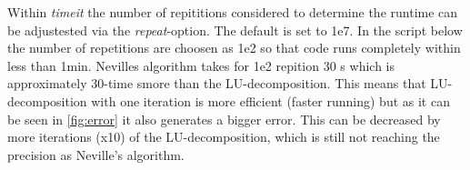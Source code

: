 Within \textit{timeit} the number of repititions considered to determine the runtime can be adjustested via the \textit{repeat}-option. The default is set to 1e7. In the script below the number of repetitions are choosen as 1e2 so that code runs completely within less than 1min. Nevilles algorithm takes for 1e2 repition 30 s which is approximately 30-time smore than the LU-decomposition. This means that LU-decomposition with one iteration is more efficient (faster running) but as it can be seen in \ref{fig:error} it also generates a bigger error. This can be decreased by more iterations (x10) of the LU-decomposition, which is still not reaching the precision as Neville's algorithm.


